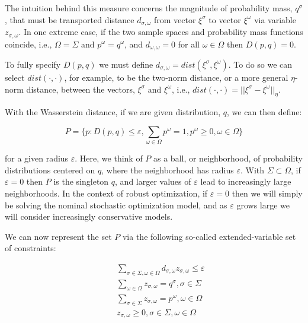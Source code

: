 The intuition behind this measure concerns the magnitude of probability mass, $q^\sigma$,
that must be transported distance $d_{\sigma, \omega}$ from vector $\xi^\sigma$ to vector $\xi^\omega$
via variable $z_{\sigma, \omega}$. In one extreme case, if the two sample spaces and probability
mass functions coincide, i.e., $\Omega = \Sigma$ and $p^\omega = q^\omega$, and $d_{\omega, \omega} = 0$
for all $\omega \in \Omega$ then $D(p, q) = 0$.

To fully specify $D(p, q)$ we must define $d_{\sigma, \omega}= dist(\xi^\sigma, \xi^\omega)$.
To do so we can select $dist(\cdot, \cdot)$, for example, to be the two-norm distance, or a more
general $\eta$-norm distance, between the vectors, $\xi^\sigma$ and $\xi^\omega$,
i.e., $dist(\cdot, \cdot) = ||\xi^\sigma - \xi^\omega||_\eta$.

With the Wasserstein distance, if we are given distribution, $q$, we can then define:

\begin{equation}
P=\{p: D(p,q)\le \varepsilon, \sum_{\omega\in \Omega} p^\omega = 1, p^\omega \ge 0, \omega \in \Omega \}
\end{equation}

for a given radius $\varepsilon$. Here, we think of $P$ as a ball, or neighborhood, of
probability distributions centered on $q$, where the neighborhood has radius $\varepsilon$.
With $\Sigma \subset \Omega$, if $\varepsilon = 0$ then $P$ is the singleton ${q}$, and
larger values of $\varepsilon$ lead to increasingly large neighborhoods. In the context
of robust optimization, if $\varepsilon = 0$ then we will simply be solving the nominal
stochastic optimization model, and as $\varepsilon$ grows large we will consider
increasingly conservative models.

We can now represent the set $P$ via the following so-called extended-variable set of constraints:

\begin{subequations}\label{WassersteinConstraints}
\begin{eqnarray}
& & \sum_{\sigma \in \Sigma, \omega \in \Omega} d_{\sigma, \omega} z_{\sigma, \omega} \le \varepsilon \\
& & \sum_{\omega \in \Omega} z_{\sigma, \omega} = q^\sigma, \sigma \in \Sigma \\
& & \sum_{\sigma \in \Sigma} z_{\sigma, \omega} = p^\omega, \omega \in \Omega \\
& & z_{\sigma, \omega} \ge 0, \sigma \in \Sigma, \omega \in \Omega
\end{eqnarray}
\end{subequations}

